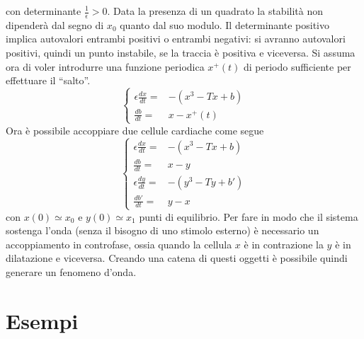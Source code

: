 \documentclass[12pt, a4paper]{book}
\theoremstyle{theorem}
\begin{document}
			con determinante $\frac{1}{\epsilon}>0$.
			Data la presenza di un quadrato la stabilità non dipenderà dal segno di $x_0$ quanto dal suo modulo.
			Il determinante positivo implica autovalori entrambi positivi o entrambi negativi: si avranno autovalori positivi, quindi un punto instabile, se la traccia è positiva e viceversa.
			Si assuma ora di voler introdurre una funzione periodica $x^+(t)$ di periodo sufficiente per effettuare il ``salto''.
			\begin{equation*}
				\begin{cases}
					\epsilon\frac{dx}{dt}=&-\left(x^3-Tx+b\right)\\
					\frac{db}{dt}=&x-x^+(t)
				\end{cases}
			\end{equation*}
			Ora è possibile accoppiare due cellule cardiache come segue
			\begin{equation*}
				\begin{cases}
					\epsilon\frac{dx}{dt}=&-\left(x^3-Tx+b\right)\\
					\frac{db}{dt}=&x-y\\
					\epsilon\frac{dy}{dt}=&-\left(y^3-Ty+b'\right)\\
					\frac{db'}{dt}=&y-x
				\end{cases}
			\end{equation*}
			con $x(0)\simeq x_0$ e $y(0)\simeq x_1$ punti di equilibrio.
			Per fare in modo che il sistema sostenga l'onda (senza il bisogno di uno stimolo esterno) è necessario un accoppiamento in controfase, ossia quando la cellula $x$ è in contrazione la $y$ è in dilatazione e viceversa.
			Creando una catena di questi oggetti è possibile quindi generare un fenomeno d'onda.

		\section{Esempi}
\end{document}
